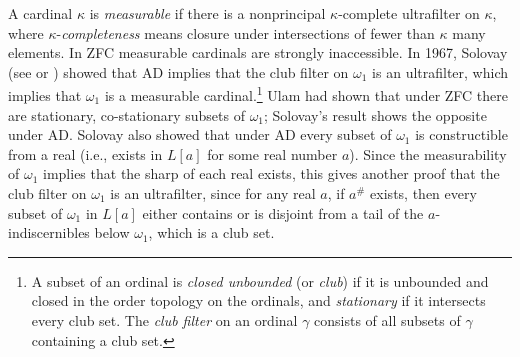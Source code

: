 \documentclass{book}%
\begin{document}
A cardinal $\kappa$ is \emph{measurable} if there is
a nonprincipal $\kappa$-complete ultrafilter on $\kappa$, where
$\kappa$-\emph{completeness}
means closure under intersections of fewer than $\kappa$ many elements. In
ZFC measurable cardinals are strongly inaccessible. In 1967, Solovay (see \cite[p.~633]{Jech:settheory} or \cite[p.~348]{Kanamori}) showed that AD implies that the club filter on $\omega_{1}$ is an ultrafilter, which
implies
that $\omega_{1}$ is a measurable cardinal.\footnote{A subset of an ordinal is
\emph{closed unbounded} (or \emph{club})
if it is unbounded and closed in the order topology on the ordinals,
and \emph{stationary} if it
intersects every club set. The
\emph{club filter}
on an ordinal $\gamma$ consists of all subsets of $\gamma$
containing a club set.} Ulam had shown that under ZFC there are
stationary, co-stationary subsets of $\omega_{1}$; Solovay's result
shows the opposite under AD. Solovay also showed that under AD every
subset of $\omega_{1}$ is constructible from a real (i.e., exists in
$L[a]$ for some real number $a$). Since the measurability of
$\omega_{1}$ implies that the sharp of each real exists, this gives
another proof that the club filter on $\omega_{1}$ is an
ultrafilter, since for any real $a$, if $a^{\#}$ exists, then every
subset of $\omega_{1}$ in $L[a]$ either contains or is disjoint from
a tail of the $a$-indiscernibles below $\omega_{1}$, which is a club
set.
\end{document}
